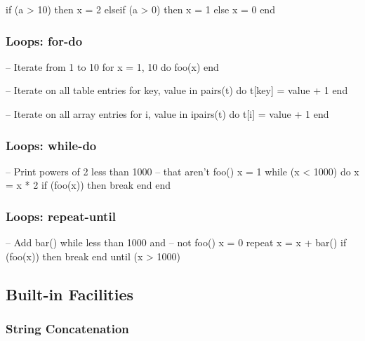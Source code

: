 \documentclass[11pt]{article}
\begin{document}
\begin{LuaCode}
if (a > 10) then
	x = 2
elseif (a > 0) then
	x = 1
else
	x = 0
end
\end{LuaCode}

\subsubsection{Loops: for-do}

\begin{LuaCode}
-- Iterate from 1 to 10
for x = 1, 10 do
	foo(x)
end
\end{LuaCode}

\begin{LuaCode}
-- Iterate on all table entries
for key, value in pairs(t) do
	t[key] = value + 1
end
\end{LuaCode}

\begin{LuaCode}
-- Iterate on all array entries
for i, value in ipairs(t) do
	t[i] = value + 1
end
\end{LuaCode}

\subsubsection{Loops: while-do}

\begin{LuaCode}
-- Print powers of 2 less than 1000
-- that aren’t foo()
x = 1
while (x < 1000) do
	x = x * 2
	if (foo(x)) then
		break
	end
end
\end{LuaCode}

\subsubsection{Loops: repeat-until}

\begin{LuaCode}
-- Add bar() while less than 1000 and
-- not foo()
x = 0
repeat
	x = x + bar()
	if (foo(x)) then
		break
	end
until (x > 1000)
\end{LuaCode}

\subsection{Built-in Facilities}

\subsubsection{String Concatenation}
\end{document}
